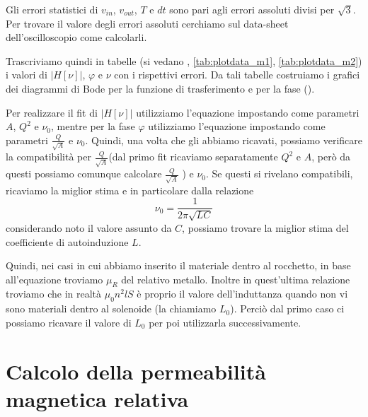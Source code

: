 \documentclass[
    rmp,
    floatfix,
    reprint, 
    superscriptaddress, 
    altaffilletter, 
    amsmath, 
    amssymb, 
    a4paper]{revtex4-2}
\begin{document}
Gli errori statistici di $v_{in}$, $v_{out}$, $T$ e $dt$ sono pari agli errori assoluti divisi per $\sqrt{3}$. Per trovare il valore degli errori assoluti cerchiamo sul data-sheet dell'oscilloscopio come calcolarli.

Trascriviamo quindi in tabelle (si vedano , \ref{tab:plotdata_m1}, \ref{tab:plotdata_m2}) i valori di $\big|H[\nu]\big|$, $\varphi$ e $\nu$ con i rispettivi errori. Da tali tabelle costruiamo i grafici dei diagrammi di Bode per la funzione di trasferimento e per la fase (). 



Per realizzare il fit di $\big|H[\nu]\big|$ utilizziamo l'equazione  impostando come parametri $A$, $Q^2$ e $\nu_{0}$, mentre per la fase $\varphi$ utilizziamo l'equazione  impostando come parametri $\frac{Q}{\sqrt{A}}$ e $\nu_0$. Quindi, una volta che gli abbiamo ricavati, possiamo verificare la compatibilità per $\frac{Q}{\sqrt{A}}$(dal primo fit ricaviamo separatamente $Q^2$ e $A$, però da questi possiamo comunque calcolare $\frac{Q}{\sqrt{A}}$ ) e $\nu_0$. Se questi si rivelano compatibili, ricaviamo la miglior stima e in particolare dalla relazione \[\nu_0=\frac{1}{2\pi\sqrt{LC}}\]  considerando noto il valore assunto da $C$, possiamo trovare la miglior stima del coefficiente di autoinduzione $L$. 

Quindi, nei casi in cui abbiamo inserito il materiale dentro al rocchetto, in base all'equazione  troviamo $\mu_R$ del relativo metallo. Inoltre in quest'ultima relazione troviamo che in realtà $\mu_0 n^2 l S$ è proprio il valore dell'induttanza quando non vi sono materiali dentro al solenoide (la chiamiamo $L_0$). Perciò dal primo caso ci possiamo ricavare il valore di $L_0$ per poi utilizzarla successivamente. 




\section*{Calcolo della permeabilità magnetica relativa}
\end{document}

